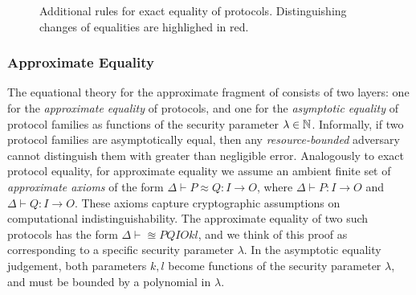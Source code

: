 \begin{figure*}
\begin{mathpar}
\end{mathpar}
\caption{Additional rules for exact equality of \ipdl protocols. Distinguishing changes of equalities are highlighed in {\color{red} red}.}
\label{fig:protocols_equality_strict_2}
\end{figure*}

\subsubsection{Approximate Equality}
The equational theory for the approximate fragment of \ipdl consists of two layers: one for the \emph{approximate equality} of protocols, and one for the \emph{asymptotic equality} of protocol families as functions of the security parameter $\lambda \in \nat$. Informally, if two protocol families are asymptotically equal, then any \emph{resource-bounded} adversary cannot distinguish them with greater than negligible error. Analogously to exact protocol equality, for approximate equality we assume an ambient finite set of \emph{approximate axioms} of the form $\Delta \vdash P \approx Q : I \to O$, where $\Delta \vdash P : I \to O$ and $\Delta \vdash Q : I \to O$. These axioms capture cryptographic assumptions on computational indistinguishability. The approximate equality of two such protocols has the form $\Delta \vdash \approxeq{P}{Q}{I}{O}{k}{l}$, and we think of this proof as corresponding to a specific security parameter $\lambda$. In the asymptotic equality judgement, both parameters $k, l$ become functions of the security parameter $\lambda$, and must be bounded by a polynomial in $\lambda$.


